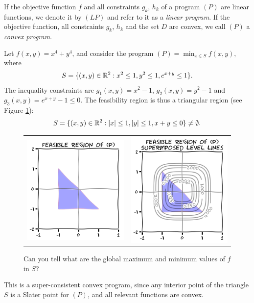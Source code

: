 If the objective function $f$ and all constraints $g_k$, $h_k$ of a program $(P)$ are linear functions, we denote it by $(LP)$ and refer to it as a \emph{linear program}.  If the objective function, all constraints $g_k$, $h_k$ and the set $D$ are convex, we call $(P)$ a \emph{convex program}.

\begin{example}\label{example:feasibleP1}
Let $f(x,y)=x^4+y^4$, and consider the program $(P) = \min_{x\in S} f(x,y)$, where 
\begin{equation*}
S = \{ (x,y) \in \mathbb{R}^2: x^2 \leq 1, y^2 \leq 1, e^{x+y}\leq 1\}.
\end{equation*}
The inequality constraints are $g_1(x,y)=x^2-1$, $g_2(x,y)=y^2-1$ and $g_3(x,y)=e^{x+y}-1\leq 0$.  The feasibility region is thus a triangular region (see Figure \ref{figure:feasibleP1}):
\begin{equation*}
S = \{ (x,y) \in \mathbb{R}^2 : \lvert x \rvert \leq 1, \lvert y \rvert \leq 1, x+y \leq 0 \} \neq \emptyset.
\end{equation*}
\begin{figure}[ht!]
\begin{tabular}{cc}
\includegraphics[width=0.5\linewidth]{images/feasibleP1.png} &
\includegraphics[width=0.5\linewidth]{images/feasibleP2.png} 
\end{tabular}
\caption{Can you tell what are the global maximum and minimum values of $f$ in $S$?}
\label{figure:feasibleP1}
\end{figure}
This is a super-consistent convex program, since any interior point of the triangle $S$ is a Slater point for $(P)$, and all relevant functions are convex.
\end{example}

